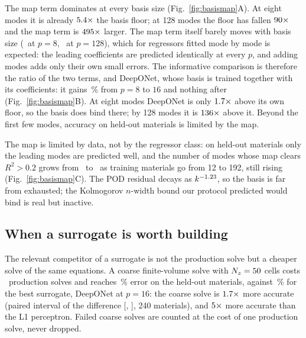\documentclass[10pt,a4paper]{article}
\begin{document}
The map term dominates at every basis size (Fig.~\ref{fig:basismap}A). At eight modes it
is already \(5.4\times\) the basis floor; at 128 modes the floor has fallen
\(90\times\) and the map term is \(495\times\) larger. The map
term itself barely moves with basis size (\nMtMapEight\ at \(p = 8\), \nMtMapHigh\ at
\(p = 128\)), which for regressors fitted mode by mode is expected: the leading
coefficients are predicted identically at every \(p\), and adding modes adds only their
own small errors. The informative comparison is therefore the ratio of the two terms, and
DeepONet, whose basis is trained together with its coefficients: it gains
\nLfiveVtwoGainPct\,\% from \(p = 8\) to \(16\) and nothing after
(Fig.~\ref{fig:basismap}B). At eight modes DeepONet is only
\(1.7\times\) above its own floor, so the basis does bind there; by
128 modes it is \(136\times\) above it. Beyond the first few modes,
accuracy on held-out materials is limited by the map.

The map is limited by data, not by the regressor class: on held-out materials only the
leading modes are predicted well, and the number of modes whose map clears
\(R^2 > 0.2\) grows from \nLCmodesSmall\ to \nLCmodesLarge\ as training materials go from 12
to 192, still rising (Fig.~\ref{fig:basismap}C). The POD residual decays as
\(k^{-1.23}\), so the basis is far from exhausted; the Kolmogorov \(n\)-width
bound our protocol predicted would bind is real but inactive.

\subsection{When a surrogate is worth building}
\label{sec:cost}

The relevant competitor of a surrogate is not the production solve but a cheaper solve of
the same equations. A coarse finite-volume solve with \(N_z = 50\) cells costs
\nCoarseSolveEq\ production solves and reaches \nCvsCoarse\,\% error on the held-out
materials, against \nCvsDon\,\% for the best surrogate, DeepONet at \(p = 16\): the coarse
solve is \(1.7\times\) more accurate (paired interval of the difference
[\nCvsLo, \nCvsHi], 240 materials), and \(5\times\) more accurate than the L1
perceptron. Failed coarse solves are counted at the cost of one production solve, never
dropped.
\end{document}
